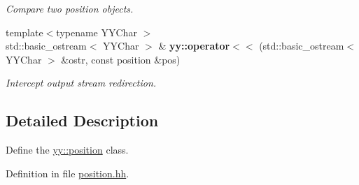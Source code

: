 \begin{DoxyCompactItemize}
\begin{DoxyCompactList}\small\item\em Compare two position objects. \end{DoxyCompactList}\item 
{\footnotesize template$<$typename Y\-Y\-Char $>$ }\\std\-::basic\-\_\-ostream$<$ Y\-Y\-Char $>$ \& {\bfseries yy\-::operator$<$$<$} (std\-::basic\-\_\-ostream$<$ Y\-Y\-Char $>$ \&ostr, const position \&pos)
\begin{DoxyCompactList}\small\item\em Intercept output stream redirection. \end{DoxyCompactList}\end{DoxyCompactItemize}


\subsection{Detailed Description}
Define the \hyperlink{classyy_1_1position}{yy\-::position} class. 

Definition in file \hyperlink{position_8hh_source}{position.\-hh}.

